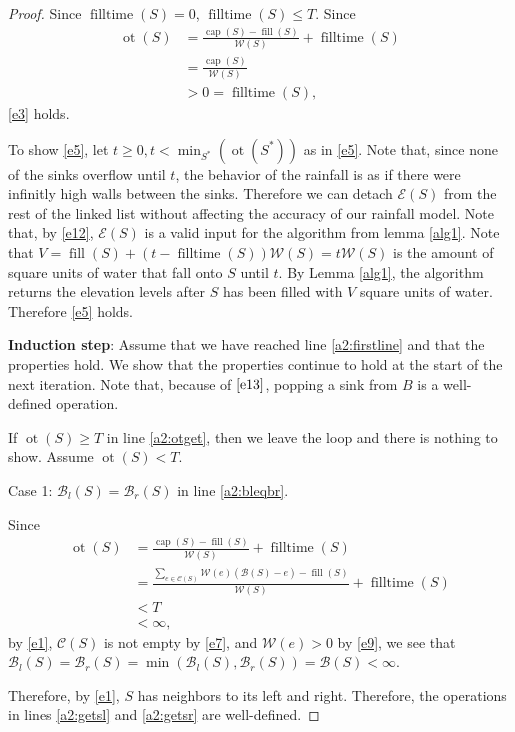 \documentclass[11pt,a4paper]{article}
\DeclareMathOperator{\capp}{cap}
\DeclareMathOperator{\ot}{ot}
\DeclareMathOperator{\Fill}{fill}
\DeclareMathOperator{\filltime}{filltime}
\begin{document}
\begin{proof}
Since $\filltime(S) = 0$, $\filltime(S) \le T$.
Since
\begin{align*}
    \ot(S) &= \frac{\capp(S) - \Fill(S)}{\mathcal{W}(S)} + \filltime(S) \\
           &= \frac{\capp(S)}{\mathcal{W}(S)} \\
           &> 0 = \filltime(S),
\end{align*}
\ref{e3} holds.

To show \ref{e5}, let $t\ge0, t<\min_{S^*}(\ot(S^*))$ as in \ref{e5}.
Note that, since none of the sinks overflow until $t$, the behavior of the rainfall is as if
there were infinitly high walls between the sinks.
Therefore we can detach $\mathcal{E}(S)$ from the rest of the linked list without affecting the accuracy of our rainfall model.
Note that, by \ref{e12}, $\mathcal{E}(S)$ is a valid input for the algorithm from lemma \ref{alg1}.
Note that $V = \Fill(S) + (t - \filltime(S))\mathcal{W}(S) = t\mathcal{W}(S)$ is the amount of square units of water that fall onto $S$ until $t$.
By Lemma \ref{alg1}, the algorithm returns the elevation levels after $S$ has been filled with $V$ square units of water.
Therefore \ref{e5} holds.

\textbf{Induction step}: Assume that we have reached line \ref{a2:firstline} and that the properties hold.
We show that the properties continue to hold at the start of the next iteration.
Note that, because of $\ref{e13}$, popping a sink from $B$ is a well-defined operation.

If $\ot(S)\ge T$ in line \ref{a2:otget}, then we leave the loop and there is nothing to show.
Assume $\ot(S) < T$.

Case 1: $\mathcal{B}_l(S) = \mathcal{B}_r(S)$ in line \ref{a2:bleqbr}.

Since 
\begin{align*}
    \ot(S) &= \frac{\capp(S) - \Fill(S)}{\mathcal{W}(S)} + \filltime(S) \\
           &= \frac{\sum_{e\in\mathcal{C}(S)} \mathcal{W}(e)(\mathcal{B}(S)-e) - \Fill(S)}{\mathcal{W}(S)} + \filltime(S) \\
           &< T \\
           &< \infty,
\end{align*}
by \ref{e1}, $\mathcal{C}(S)$ is not empty by \ref{e7}, and $\mathcal{W}(e) > 0$ by \ref{e9},
we see that $\mathcal{B}_l(S) = \mathcal{B}_r(S) = \min(\mathcal{B}_l(S), \mathcal{B}_r(S)) = \mathcal{B}(S) < \infty$.

Therefore, by \ref{e1}, $S$ has neighbors to its left and right.
Therefore, the operations in lines \ref{a2:getsl} and \ref{a2:getsr} are well-defined.


\end{proof}
\end{document}
